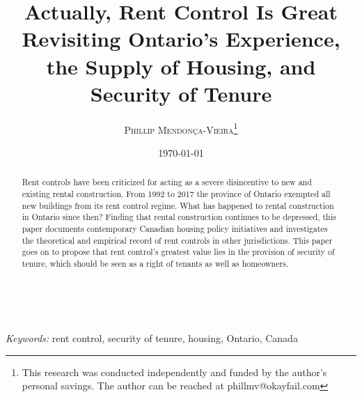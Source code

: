 \documentclass[letterpaper,12pt]{article} %
\title{\textsf{\textbf{Actually, Rent Control Is Great}\\ %
Revisiting Ontario's Experience, the Supply of Housing, and Security of Tenure}} %
\author{\textsc{Phillip Mendonça-Vieira}\footnote{ This research was conducted independently and funded by the author's personal savings. The author can be reached at phillmv@okayfail.com}}
\date{\today} %
\makeatletter
\renewcommand{\maketitle}{ %
\begin{flushright} %
{\LARGE\@title} %

\vspace{50pt} %

{\large\@author} %
\\\@date %

\vspace{40pt} %
\end{flushright}
}
\makeatother
\begin{document}
\maketitle %


\renewcommand{\abstractname}{\sffamily{Abstract}} %


\begin{abstract}
  Rent controls have been criticized for acting as a severe disincentive to new and existing rental construction. From 1992 to 2017 the province of Ontario exempted all new buildings from its rent control regime. What has happened to rental construction in Ontario since then? Finding that rental construction continues to be depressed, this paper documents contemporary Canadian housing policy initiatives and investigates the theoretical and empirical record of rent controls in other jurisdictions. This paper goes on to propose that rent control's greatest value lies in the provision of security of tenure, which should be seen as a right of tenants as well as homeowners.
\end{abstract}

\hspace*{3,6mm}\textit{Keywords:} rent control, security of tenure, housing, Ontario, Canada %

\vspace{30pt} %

\end{document}
